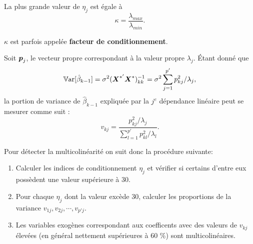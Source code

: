La plus grande valeur de $\eta_j$ est égale à
$$\kappa=\frac{\lambda_{max}}{\lambda_{min}}.$$

$\kappa$ est parfois appelée \textbf{ facteur de conditionnement}.


%
%
%
%


Soit $\mbox{\boldmath$p$\unboldmath}_j$, le vecteur propre correspondant à la valeur propre $\lambda_j$.
Étant donné que
$$\mathbb{V}\text{ar}[\hat\beta_{k-1}]=\sigma^2(\mbox{\boldmath$X$\unboldmath}^{*'}\mbox{\boldmath$X$\unboldmath}^*)^{-1}_{kk}=\sigma^2\sum_{j=1}^{p'}p_{kj}^2/\lambda_j,$$
la portion de variance de $\hat\beta_{k-1}$ expliquée par la $j^{e}$ dépendance linéaire peut se mesurer comme suit :
$$v_{kj}=\frac{p_{kj}^2/\lambda_j}{\sum\limits_{l=1}^{p'}p_{kl}^2/\lambda_l}.$$

Pour détecter la multicolinéarité on suit donc la procédure suivante:
\begin{enumerate}
\item Calculer les indices de conditionnement $\eta_j$ et vérifier si certains d'entre eux possèdent une valeur supérieure à 30.
\item Pour chaque $\eta_j$ dont la valeur excède 30, calculer les proportions de la variance $v_{1j},v_{2j},\cdots,v_{p'j}$.
\item Les variables exogènes correspondant aux coefficents avec des valeurs de $v_{kj}$ élevées (en général nettement supérieures à 60 \%) sont multicolinéaires.
\end{enumerate}

